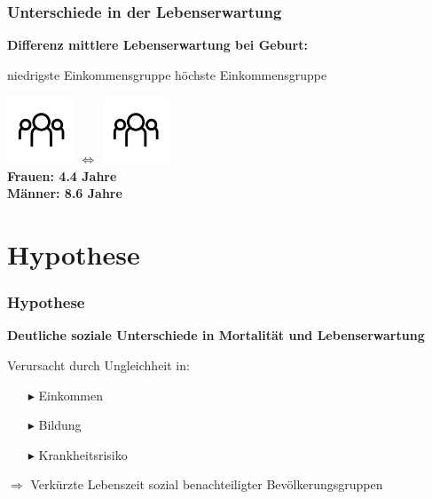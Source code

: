 \documentclass{beamer}
\begin{document}
\begin{frame}
 \frametitle{Unterschiede in der Lebenserwartung}
\textbf{Differenz mittlere Lebenserwartung bei Geburt:}

niedrigste Einkommensgruppe \hfill höchste Einkommensgruppe

\hspace{1.5cm}\includegraphics[height=2cm]{Personen}\hspace{2cm} 
$\Longleftrightarrow$ \hspace{2cm}\includegraphics[height=2cm]{Personen}\\
\vspace{0.5cm}
\hspace{4.3cm} \textbf{Frauen: 4.4 Jahre}\\
\hspace{4.3cm} \textbf{Männer: 8.6 Jahre}
     
    
\end{frame}


\section{Hypothese}
\begin{frame}
 \frametitle{Hypothese}
 \textbf{Deutliche soziale Unterschiede in Mortalität und Lebenserwartung}
 \vspace{0.4cm}
\begin{block}{Verursacht durch Ungleichheit in:}
 \begin{itemize}
   \item [$\blacktriangleright$] Einkommen
   \item [$\blacktriangleright$] Bildung
   \item [$\blacktriangleright$] Krankheitsrisiko
 \end{itemize}
\end{block}
 \vspace{0.5cm}
 $\Rightarrow$ Verkürzte Lebenszeit sozial benachteiligter Bevölkerungsgruppen
\end{frame}
\end{document}
